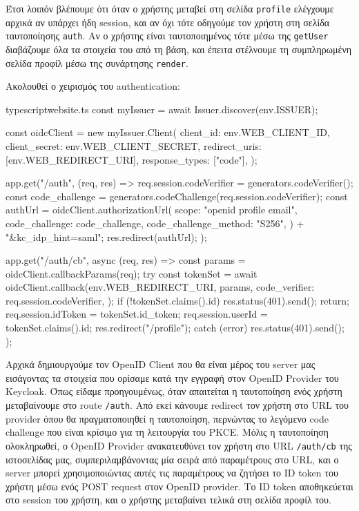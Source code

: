 \documentclass[../thesis.tex]{subfiles}
\begin{document}
Έτσι λοιπόν βλέπουμε ότι όταν ο χρήστης μεταβεί στη σελίδα \texttt{profile} ελέγχουμε αρχικά αν υπάρχει ήδη session, και αν όχι τότε οδηγούμε τον χρήστη στη σελίδα ταυτοποίησης \texttt{auth}.
Αν ο χρήστης είναι ταυτοποιημένος τότε μέσω της \texttt{getUser} διαβάζουμε όλα τα στοιχεία του από τη βάση, και έπειτα στέλνουμε τη συμπληρωμένη σελίδα προφίλ μέσω της συνάρτησης \texttt{render}.

\bigskip

Ακολουθεί ο χειρισμός του authentication:

\begin{codeblock}{typescript}{website.ts}
  const myIssuer = await Issuer.discover(env.ISSUER);

  const oidcClient = new myIssuer.Client({
    client_id: env.WEB_CLIENT_ID,
    client_secret: env.WEB_CLIENT_SECRET,
    redirect_uris: [env.WEB_REDIRECT_URI],
    response_types: ["code"],
  });

  app.get("/auth", (req, res) => {
    req.session.codeVerifier = generators.codeVerifier();
    const code_challenge = generators.codeChallenge(req.session.codeVerifier);
    const authUrl =
      oidcClient.authorizationUrl({
        scope: "openid profile email",
        code_challenge: code_challenge,
        code_challenge_method: "S256",
      }) + "&kc_idp_hint=saml";
    res.redirect(authUrl);
  });

  app.get("/auth/cb", async (req, res) => {
    const params = oidcClient.callbackParams(req);
    try {
      const tokenSet = await oidcClient.callback(env.WEB_REDIRECT_URI, params, {
        code_verifier: req.session.codeVerifier,
      });
      if (!tokenSet.claims().id) {
        res.status(401).send();
        return;
      }
      req.session.idToken = tokenSet.id_token;
      req.session.userId = tokenSet.claims().id;
      res.redirect("/profile");
    } catch (error) {
      res.status(401).send();
    }
  });
\end{codeblock}

Αρχικά δημιουργούμε τον OpenID Client που θα είναι μέρος του server μας εισάγοντας τα στοιχεία που ορίσαμε κατά την εγγραφή στον OpenID Provider του Keycloak.
Όπως είδαμε προηγουμένως, όταν απαιτείται η ταυτοποίηση ενός χρήστη μεταβαίνουμε στο route \texttt{/auth}.
Από εκεί κάνουμε redirect τον χρήστη στο URL του provider όπου θα πραγματοποιηθεί η ταυτοποίηση, περνώντας το λεγόμενο code challenge που είναι κρίσιμο για τη λειτουργία του PKCE.
Μόλις η ταυτοποίηση ολοκληρωθεί, ο OpenID Provider ανακατευθύνει τον χρήστη στο URL \texttt{/auth/cb} της ιστοσελίδας μας, συμπεριλαμβάνοντας μία σειρά από παραμέτρους στο URL, και ο server μπορεί χρησιμοποιώντας αυτές τις παραμέτρους να ζητήσει το ID token του χρήστη μέσω ενός POST request στον OpenID provider.
Το ID token αποθηκεύεται στο session του χρήστη, και ο χρήστης μεταβαίνει τελικά στη σελίδα προφίλ του.
\end{document}

